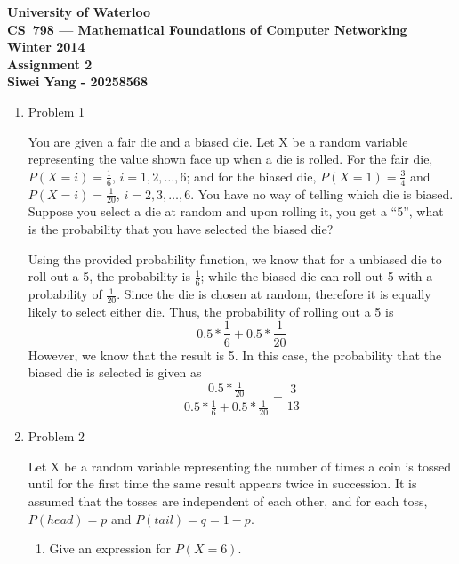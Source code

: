 \documentclass[letterpaper]{article}
\begin{document}
\begin{center}
\large\bf University of Waterloo\\
CS~798 --- Mathematical Foundations of Computer Networking\\
Winter 2014\\
Assignment 2\\
Siwei Yang - 20258568\\
\end{center}
\bigskip

\begin{enumerate}
\item{Problem 1}
\begin{mdframed}
You are given a fair die and a biased die. Let X be a random variable representing the value shown face up when a die is rolled. For the fair die, $P(X = i) = \frac{1}{6}$, $i = 1, 2, \dots, 6$; and for the biased die, $P(X = 1) = \frac{3}{4}$ and $P(X = i) = \frac{1}{20}$, $i = 2, 3, \dots, 6$. You have no way of telling which die is biased. Suppose you select a die at random and upon rolling it, you get a “5”, what is the probability that you have selected the biased die?
\end{mdframed}

Using the provided probability function, we know that for a unbiased die to roll out a 5, the probability is $\frac{1}{6}$; while the biased die can roll out 5 with a probability of $\frac{1}{20}$. Since the die is chosen at random, therefore it is equally likely to select either die. Thus, the probability of rolling out a 5 is
\begin{equation}
0.5 * \frac{1}{6} + 0.5 * \frac{1}{20}
\end{equation}
However, we know that the result is 5. In this case, the probability that the biased die is selected is given as
\begin{equation}
\frac{0.5 * \frac{1}{20}}{0.5 * \frac{1}{6} + 0.5 * \frac{1}{20}} = \frac{3}{13}
\end{equation}

\medskip

\item{Problem 2}
\begin{mdframed}
Let X be a random variable representing the number of times a coin is tossed until for the first time the same result appears twice in succession. It is assumed that the tosses are independent of each other, and for each toss, $P(head) = p$ and $P(tail) = q = 1- p$.
\end{mdframed}
\begin{enumerate}
\item{} Give an expression for $P(X = 6)$. 


\end{enumerate}
\end{enumerate}
\end{document}
